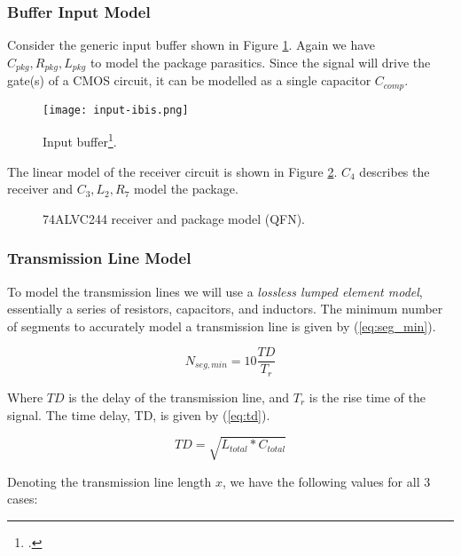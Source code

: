 \documentclass[../main.tex]{subfiles}
\begin{document}
\newpage

\subsubsection{Buffer Input Model}

Consider the generic input buffer shown in Figure \ref{fig:ibis-input}. Again we have $C_{pkg}, R_{pkg}, L_{pkg}$ to model the package parasitics. Since the signal will drive the gate(s) of a CMOS circuit, it can be modelled as a single capacitor $C_{comp}$.

\begin{figure}[h]
    \centering
    \texttt{[image: input-ibis.png]}
    \caption{Input buffer\footcite{ibis}.}
    \label{fig:ibis-input}
\end{figure}

The linear model of the receiver circuit is shown in Figure \ref{fig:receiver-package}. $C_4$ describes the receiver and $C_3, L_2, R_7$ model the package.

\begin{figure}[h]
    \centering
    \caption{74ALVC244 receiver and package model (QFN).}
    \label{fig:receiver-package}
\end{figure}

\subsubsection{Transmission Line Model}

To model the transmission lines we will use a \textit{lossless lumped element model}, essentially a series of resistors, capacitors, and inductors. The minimum number of segments to accurately model a transmission line is given by (\ref{eq:seg_min}).

\begin{equation} \label{eq:seg_min}
    N_{seg, min} = 10 \frac{TD}{T_{r}}
\end{equation}

Where $TD$ is the delay of the transmission line, and $T_{r}$ is the rise time of the signal. The time delay, TD, is given by (\ref{eq:td}).

\begin{equation} \label{eq:td}
    TD = \sqrt{L_{total} * C_{total}}
\end{equation}

Denoting the transmission line length $x$, we have the following values for all 3 cases:
\end{document}
